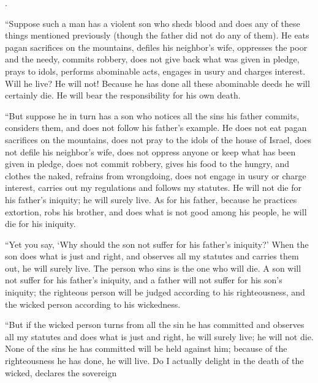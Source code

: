 {{}.
\par }{\PP {}“Suppose such a man has
a violent
son
who sheds
blood
and does
any of these
things mentioned previously
(though
the father
did not
do
any
of them). He eats
pagan
sacrifices on the mountains,
defiles
his neighbor’s
wife,
oppresses
the poor
and the needy,
commits
robbery,
does not
give back
what was given in pledge,
prays to
idols,
performs
abominable
acts,
engages
in usury
and charges
interest.
Will he live? He will not! Because he has done
all
these
abominable deeds
he will certainly die.
He will bear
the responsibility
for his own death.
\par }{\PP {}“But suppose
he in turn has
a son
who notices
all
the sins
his father
commits,
considers
them, and does not
follow his father’s example.
He does not
eat
pagan
sacrifices on
the mountains,
does not
pray
to the idols
of the house
of Israel,
does not
defile
his neighbor’s
wife,
does not
oppress
anyone or
keep what has
been given in pledge,
does not
commit robbery, gives
his food
to the hungry,
and clothes
the naked,
refrains
from wrongdoing, does
not engage
in usury
or charge interest,
carries
out my regulations
and follows
my statutes.
He will not
die
for his father’s
iniquity;
he will surely
live.
As for his father,
because
he practices
extortion,
robs
his brother,
and does what is not
good
among
his people,
he will die
for his iniquity.
\par }{\PP {}“Yet you say,
‘Why
should the son
not
suffer
for his father’s
iniquity?’ When the son
does what is just
and right,
and observes
all
my statutes
and carries
them out, he will surely
live.
The person
who sins
is
the one
who will die.
A son
will not
suffer
for his father’s
iniquity,
and a father
will not
suffer
for his son’s
iniquity;
the righteous
person will be
judged according to his righteousness,
and the wicked
person according to his wickedness.
\par }{\PP {}“But if
the wicked
person turns from
all
the sin
he has
committed
and observes
all
my statutes
and does
what is just
and right,
he will surely
live;
he will not
die.
None
of the sins
he has committed
will be held against
him; because of the righteousness
he has
done,
he will live.
Do I actually
delight
in the death
of the wicked,
declares
the sovereign

}
